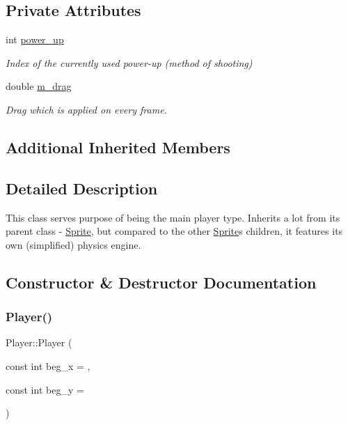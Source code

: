 \subsection*{Private Attributes}
\begin{DoxyCompactItemize}
\item 
int \hyperlink{classPlayer_ad7c3f7dc92bc22846e2af9c29eadc3c7}{power\+\_\+up}
\begin{DoxyCompactList}\small\item\em Index of the currently used power-\/up (method of shooting) \end{DoxyCompactList}\item 
double \hyperlink{classPlayer_ae60c030f7922b4c385af29e04c040ccc}{m\+\_\+drag}
\begin{DoxyCompactList}\small\item\em Drag which is applied on every frame. \end{DoxyCompactList}\end{DoxyCompactItemize}
\subsection*{Additional Inherited Members}


\subsection{Detailed Description}
This class serves purpose of being the main player type. Inherits a lot from it\textquotesingle{}s parent class -\/ \hyperlink{classSprite}{Sprite}, but compared to the other \hyperlink{classSprite}{Sprite}\textquotesingle{}s children, it features it\textquotesingle{}s own (simplified) physics engine. 

\subsection{Constructor \& Destructor Documentation}
\mbox{\label{classPlayer_a7d6d9f5784b5971d9848a9349b6ef377}} 
\subsubsection{\texorpdfstring{Player()}{Player()}}
{\footnotesize\ttfamily Player\+::\+Player (\begin{DoxyParamCaption}\item[{const int}]{beg\+\_\+x = {},  }\item[{const int}]{beg\+\_\+y = {} }\end{DoxyParamCaption})}

